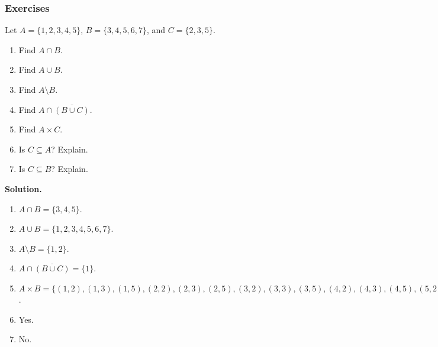 \documentclass[10pt,]{book}
\theoremstyle{plain}
\theoremstyle{definition}
\theoremstyle{definition}
\theoremstyle{definition}
\numberwithin{equation}{section}
\def\bar{\overline}
\begin{document}
\subsubsection[Exercises]{Exercises}\label{exercises-2}
\begin{exerciselist}
\item[1.]\hypertarget{exercise-11}{}
            Let \(A = \{1,2,3,4,5\}\), \(B = \{3,4,5,6,7\}\), and \(C = \{2,3,5\}\).
\leavevmode%
\begin{enumerate}[label=(\alph*)]
\item\hypertarget{li-228}{}
                Find \(A \cap B\).
\item\hypertarget{li-229}{}
                Find \(A \cup B\).
\item\hypertarget{li-230}{}
                Find \(A \setminus B\).
\item\hypertarget{li-231}{}
                Find \(A \cap \overline{(B \cup C)}\).
\item\hypertarget{li-232}{}
                Find \(A \times C\).
\item\hypertarget{li-233}{}
                Is \(C \subseteq A\)? Explain.
\item\hypertarget{li-234}{}
                Is \(C \subseteq B\)? Explain.
\end{enumerate}
\par\smallskip
\par\smallskip
\noindent\textbf{Solution.}\hypertarget{solution-23}{}\quad
\leavevmode%
\begin{enumerate}[label=(\alph*)]
\item\hypertarget{li-235}{}\(A \cap B = \{3,4,5\}\).\item\hypertarget{li-236}{}\(A \cup B = \{1,2,3,4,5,6,7\}\).\item\hypertarget{li-237}{}\(A \setminus B = \{1,2\}\).\item\hypertarget{li-238}{}\(A \cap \bar{(B \cup C)} = \{1\}\).\item\hypertarget{li-239}{}\(A \times B = \{(1,2), (1,3), (1,5), (2,2), (2,3), (2,5), (3,2), (3,3), (3,5), (4,2), (4,3), (4,5), (5,2), (5,3), (5,5)\}\).\item\hypertarget{li-240}{}
                Yes.
\item\hypertarget{li-241}{}
                No.
\end{enumerate}
\item[2.]\hypertarget{exercise-12}{}

\end{exerciselist}
\end{document}
